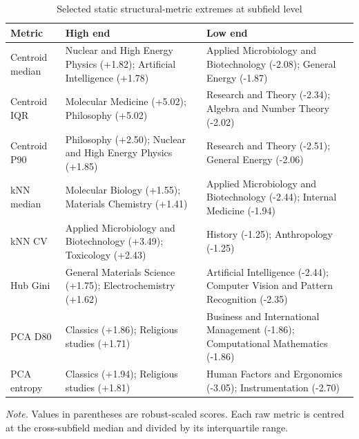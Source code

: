 \begin{table}[H]
\centering
\caption[Selected static metric extremes]{Selected static structural-metric extremes at subfield level}
\label{tab:extreme_subfields}
\scriptsize
\begin{tabular}{@{}p{}p{}p{}@{}}
\hline
\textbf{Metric} & \textbf{High end} & \textbf{Low end} \\
\hline
Centroid median & Nuclear and High Energy Physics (+1.82); Artificial Intelligence (+1.78) & Applied Microbiology and Biotechnology (-2.08); General Energy (-1.87) \\[0.15cm]
Centroid IQR & Molecular Medicine (+5.02); Philosophy (+5.02) & Research and Theory (-2.34); Algebra and Number Theory (-2.02) \\[0.15cm]
Centroid P90 & Philosophy (+2.50); Nuclear and High Energy Physics (+1.85) & Research and Theory (-2.51); General Energy (-2.06) \\[0.15cm]
kNN median & Molecular Biology (+1.55); Materials Chemistry (+1.41) & Applied Microbiology and Biotechnology (-2.44); Internal Medicine (-1.94) \\[0.15cm]
kNN CV & Applied Microbiology and Biotechnology (+3.49); Toxicology (+2.43) & History (-1.25); Anthropology (-1.25) \\[0.15cm]
Hub Gini & General Materials Science (+1.75); Electrochemistry (+1.62) & Artificial Intelligence (-2.44); Computer Vision and Pattern Recognition (-2.35) \\[0.15cm]
PCA D80 & Classics (+1.86); Religious studies (+1.71) & Business and International Management (-1.86); Computational Mathematics (-1.86) \\[0.15cm]
PCA entropy & Classics (+1.94); Religious studies (+1.81) & Human Factors and Ergonomics (-3.05); Instrumentation (-2.70) \\[0.15cm]
\hline
\end{tabular}
\par\vspace{0.12cm}
\footnotesize\textit{Note.} Values in parentheses are robust-scaled scores. Each raw metric is centred at the cross-subfield median and divided by its interquartile range.

\end{table}
